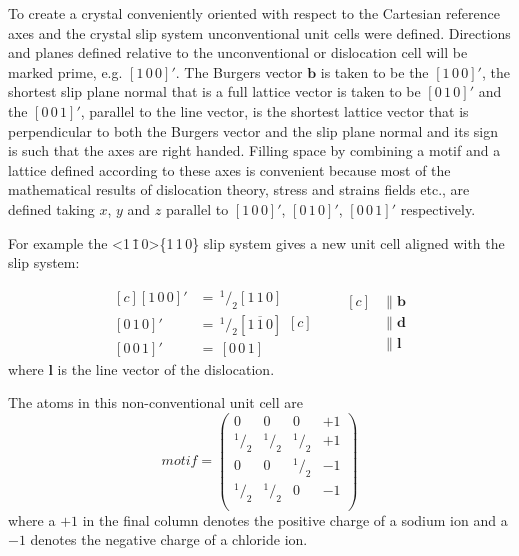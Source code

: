 To create a crystal conveniently oriented with respect to the Cartesian reference axes and the crystal slip system unconventional unit cells were defined. Directions and planes defined relative to the unconventional or dislocation cell will be marked prime, e.g. $[1\,0\,0]'$. The Burgers vector $\mathbf{b}$ is taken to be the $[1\,0\,0]'$, the shortest slip plane normal that is a full lattice vector is taken to be $[0\,1\,0]'$ and the $[0\,0\,1]'$, parallel to the line vector, is the shortest lattice vector that is perpendicular to both the Burgers vector and the slip plane normal and its sign is such that the axes are right handed. Filling space by combining a motif and a lattice defined according to these axes is convenient because most of the mathematical results of dislocation theory, stress and strains fields etc., are defined taking $x$, $y$ and $z$ parallel to $[1\,0\,0]'$, $[0\,1\,0]'$, $[0\,0\,1]'$ respectively.

For example the  <1\,\={1}\,0>\{1\,1\,0\} slip system gives a new unit cell aligned with the slip system:

\begin{equation*}
\begin{aligned}[c]
{[1\,0\,0]}' &=\, ^{1}\!/_{2} [1\,1\,0]   \\
{[0\,1\,0]}' &=\, ^{1}\!/_{2} [1\,\overline{1}\,0]   \\
{[0\,0\,1]}' &=\, [0\,0\,1]   
\end{aligned}[c]
\qquad
\begin{aligned}[c]
&\parallel \mathbf{b} \\
&\parallel \mathbf{d} \\
&\parallel \mathbf{l}
\end{aligned}
\end{equation*}
where $\mathbf{l}$ is the line vector of the dislocation.


The atoms in this non-conventional unit cell are
$$
motif = \begin{pmatrix}
0 & 0 & 0 & +1 \\
^{1}\!/_{2} & ^{1}\!/_{2} & ^{1}\!/_{2} & +1 \\
0 & 0 & ^{1}\!/_{2} & -1 \\
^{1}\!/_{2} & ^{1}\!/_{2} & 0 & -1 \\
\end{pmatrix}
$$
where a $+1$ in the final column denotes the positive charge of a sodium ion and a $-1$ denotes the negative charge of a chloride ion.



